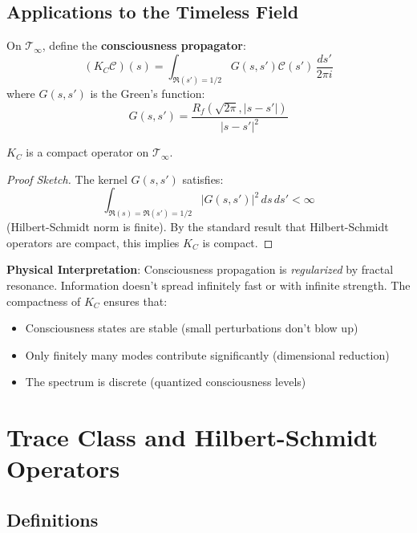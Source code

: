 \subsection{Applications to the Timeless Field}

On $\mathcal{T}_\infty$, define the \textbf{consciousness propagator}:
\begin{equation}
(K_C \mathcal{C})(s) = \int_{\Re(s') = 1/2} G(s, s') \mathcal{C}(s') \, \frac{ds'}{2\pi i}
\end{equation}
where $G(s, s')$ is the Green's function:
\begin{equation}
G(s, s') = \frac{R_f(\sqrt{2\pi}, |s-s'|)}{|s - s'|^2}
\end{equation}

\begin{theorem}\label{thm:consciousness-propagator-compact}
$K_C$ is a compact operator on $\mathcal{T}_\infty$.
\end{theorem}

\begin{proof}[Proof Sketch]
The kernel $G(s,s')$ satisfies:
\begin{equation}
\int_{\Re(s)=\Re(s')=1/2} |G(s,s')|^2 \, ds \, ds' < \infty
\end{equation}
(Hilbert-Schmidt norm is finite). By the standard result that Hilbert-Schmidt operators are compact, this implies $K_C$ is compact.
\end{proof}

\textbf{Physical Interpretation}: Consciousness propagation is \textit{regularized} by fractal resonance. Information doesn't spread infinitely fast or with infinite strength. The compactness of $K_C$ ensures that:
\begin{itemize}
\item Consciousness states are stable (small perturbations don't blow up)
\item Only finitely many modes contribute significantly (dimensional reduction)
\item The spectrum is discrete (quantized consciousness levels)
\end{itemize}

\section{Trace Class and Hilbert-Schmidt Operators}

\subsection{Definitions}

